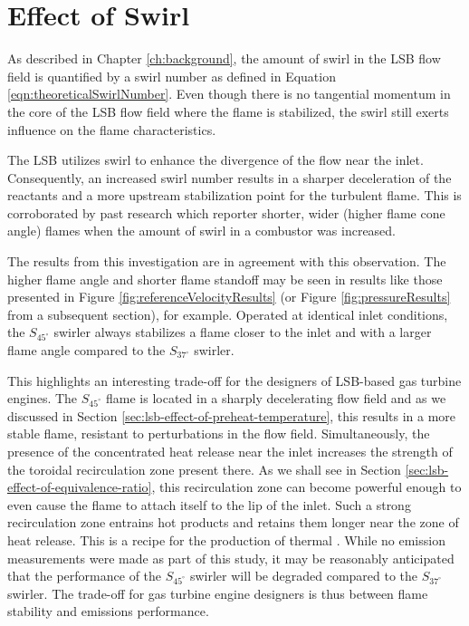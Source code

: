 \section{Effect of Swirl}
\label{sec:lsb-effect-of-swirl}

As described in Chapter \ref{ch:background}, the amount of swirl in the LSB flow field is quantified by a swirl number as defined in Equation \ref{eqn:theoreticalSwirlNumber}.
Even though there is no tangential momentum in the core of the LSB flow field where the flame is stabilized, the swirl still exerts influence on the flame characteristics.

The LSB utilizes swirl to enhance the divergence of the flow near the inlet.
Consequently, an increased swirl number results in a sharper deceleration of the reactants and a more upstream stabilization point for the turbulent flame.
This is corroborated by past research\cite{1986-starner,1992-chan} which reporter shorter, wider (higher flame cone angle) flames when the amount of swirl in a combustor was increased.

The results from this investigation are in agreement with this observation.
The higher flame angle and shorter flame standoff may be seen in results like those presented in Figure \ref{fig:referenceVelocityResults} (or Figure \ref{fig:pressureResults} from a subsequent section), for example.
Operated at identical inlet conditions, the \(S_{45^\circ}\) swirler always stabilizes a flame closer to the inlet and with a larger flame angle compared to the \(S_{37^\circ}\) swirler.

This highlights an interesting trade-off for the designers of LSB-based gas turbine engines.
The \(S_{45^\circ}\) flame is located in a sharply decelerating flow field and as we discussed in Section \ref{sec:lsb-effect-of-preheat-temperature}, this results in a more stable flame, resistant to perturbations in the flow field.
Simultaneously, the presence of the concentrated heat release near the inlet increases the strength of the toroidal recirculation zone present there.
As we shall see in Section \ref{sec:lsb-effect-of-equivalence-ratio}, this recirculation zone can become powerful enough to even cause the flame to attach itself to the lip of the inlet.
Such a strong recirculation zone entrains hot products and retains them longer near the zone of heat release.
This is a recipe for the production of thermal .
While no emission measurements were made as part of this study, it may be reasonably anticipated that the  performance of the \(S_{45^\circ}\) swirler will be degraded compared to the \(S_{37^\circ}\) swirler.
The trade-off for gas turbine engine designers is thus between flame stability and emissions performance.

